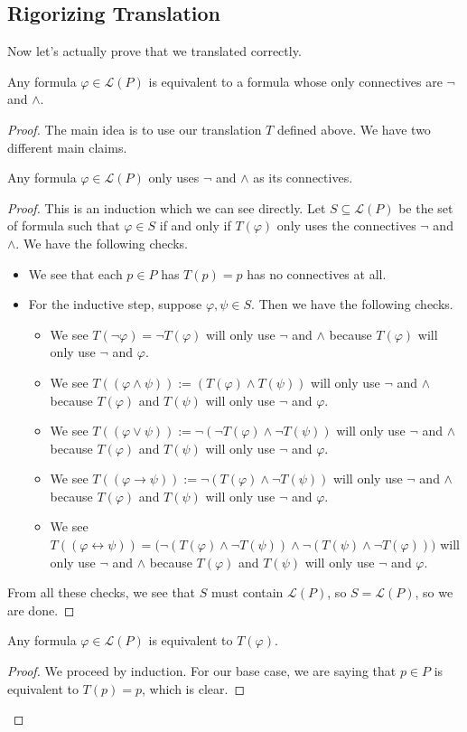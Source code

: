 \documentclass[../notes.tex]{subfiles}
\begin{document}
\subsection{Rigorizing Translation}
Now let's actually prove that we translated correctly.
\begin{theorem}
	Any formula $\varphi\in\mathcal L(P)$ is equivalent to a formula whose only connectives are $\lnot$ and $\land$.
\end{theorem}
\begin{proof}
	The main idea is to use our translation $T$ defined above. We have two different main claims.
	\begin{lemma}
		Any formula $\varphi\in\mathcal L(P)$ only uses $\lnot$ and $\land$ as its connectives.
	\end{lemma}
	\begin{proof}
		This is an induction which we can see directly. Let $S\subseteq\mathcal L(P)$ be the set of formula such that $\varphi\in S$ if and only if $T(\varphi)$ only uses the connectives $\lnot$ and $\land$. We have the following checks.
		\begin{itemize}
			\item We see that each $p\in P$ has $T(p)=p$ has no connectives at all.
			\item For the inductive step, suppose $\varphi,\psi\in S$. Then we have the following checks.
			\begin{itemize}
				\item We see $T(\lnot\varphi)=\lnot T(\varphi)$ will only use $\lnot$ and $\land$ because $T(\varphi)$ will only use $\lnot$ and $\varphi$.
				\item We see $T((\varphi\land\psi)):=(T(\varphi)\land T(\psi))$ will only use $\lnot$ and $\land$ because $T(\varphi)$ and $T(\psi)$ will only use $\lnot$ and $\varphi$.
				\item We see $T((\varphi\lor\psi)):=\lnot(\lnot T(\varphi)\land\lnot T(\psi))$ will only use $\lnot$ and $\land$ because $T(\varphi)$ and $T(\psi)$ will only use $\lnot$ and $\varphi$.
				\item We see $T((\varphi\to\psi)):=\lnot(T(\varphi)\land\lnot T(\psi))$ will only use $\lnot$ and $\land$ because $T(\varphi)$ and $T(\psi)$ will only use $\lnot$ and $\varphi$.
				\item We see $T((\varphi\leftrightarrow\psi))=\big(\lnot(T(\varphi)\land\lnot T(\psi))\land\lnot(T(\psi)\land\lnot T(\varphi))\big)$ will only use $\lnot$ and $\land$ because $T(\varphi)$ and $T(\psi)$ will only use $\lnot$ and $\varphi$.
			\end{itemize}
		\end{itemize}
		From all these checks, we see that $S$ must contain $\mathcal L(P)$, so $S=\mathcal L(P)$, so we are done.
	\end{proof}
	\begin{lemma}
		Any formula $\varphi\in\mathcal L(P)$ is equivalent to $T(\varphi)$.
	\end{lemma}
	\begin{proof}
		We proceed by induction. For our base case, we are saying that $p\in P$ is equivalent to $T(p)=p$, which is clear.


\end{proof}
\end{proof}
\end{document}
